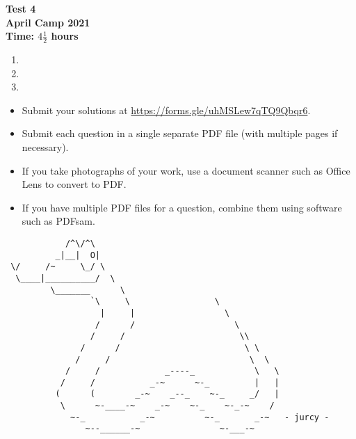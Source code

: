\documentclass{article}
\begin{document}
\thispagestyle{empty}

\begin{center}
  \textbf{\Large Test 4}
  \\ \vspace{1em}
  \textbf{\large April Camp 2021}
  \\ \vspace{1em}
  \textbf{\large Time: $4\frac{1}{2}$ hours}
\end{center}

\vfill

\begin{enumerate}[leftmargin=0pt, itemsep=18pt]

\item


\item


\item

\end{enumerate}


\vfill
\vfill
\begin{itemize}
	\item Submit your solutions at \url{https://forms.gle/uhMSLew7qTQ9Qbqr6}.
	\item Submit each question in a single separate PDF file (with multiple pages if necessary).
	\item If you take photographs of your work, use a document scanner such as Office Lens to convert to PDF.
	\item If you have multiple PDF files for a question, combine them using software such as PDFsam.
\end{itemize}

\vfill
\centering
\begin{BVerbatim}
            /^\/^\
          _|__|  O|
 \/     /~     \_/ \
  \____|__________/  \
         \_______      \
                 `\     \                 \
                   |     |                  \
                  /      /                    \
                 /     /                       \\
               /      /                         \ \
              /     /                            \  \
            /     /             _----_            \   \
           /     /           _-~      ~-_         |   |
          (      (        _-~    _--_    ~-_     _/   |
           \      ~-____-~    _-~    ~-_    ~-_-~    /
             ~-_           _-~          ~-_       _-~   - jurcy -
                ~--______-~                ~-___-~
\end{BVerbatim}
\end{document}
